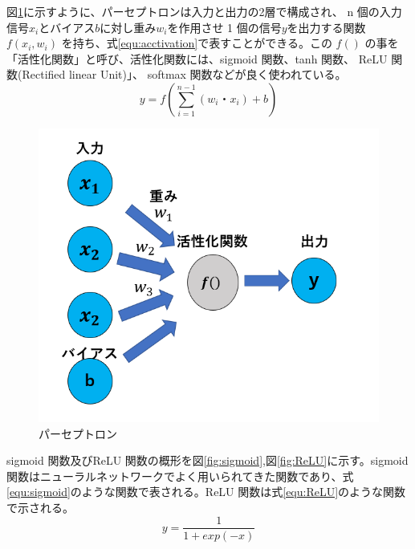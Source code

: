 図\ref{fig:perce}に示すように、パーセプトロンは入力と出力の2層で構成され、 n 個の入力信号$x_i$とバイアス$b$に対し重み$w_i$を作用させ 1 個の信号$y$を出力する関数 $f(x_i, w_i)$ を持ち、式\ref{equ:acctivation}で表すことができる。この $f( )$ の事を「活性化関数」と呼び、活性化関数には、sigmoid 関数、tanh 関数、 ReLU 関数(Rectified linear Unit)」、 softmax 関数などが良く使われている。 
\begin{equation}
    y = f(\sum^{n-1}_{i=1}(w_i・x_i) + b)
    \label{equ:acctivation}
\end{equation}
\begin{figure}[tb]
  \centering
  \includegraphics[clip, width=13cm]{fig/4/parceptron.png}
  \caption{パーセプトロン}
  \label{fig:perce}
\end{figure}
sigmoid 関数及びReLU 関数の概形を図\ref{fig:sigmoid},図\ref{fig:ReLU}に示す。sigmoid 関数はニューラルネットワークでよく用いられてきた関数であり、式\ref{equ:sigmoid}のような関数で表される。ReLU 関数は式\ref{equ:ReLU}のような関数で示される。
\begin{equation}
    y = \frac{1}{1+exp(-x)}
    \label{equ:sigmoid}
\end{equation}

